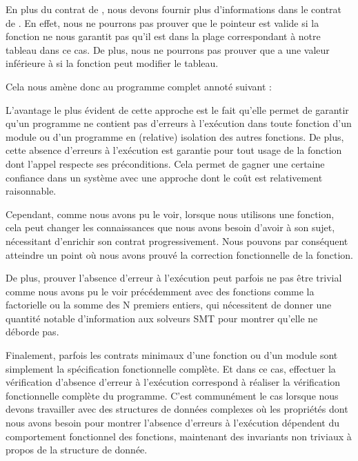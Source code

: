En plus du contrat de , nous devons fournir plus d'informations
dans le contrat de . En effet, nous ne pourrons pas prouver
que le pointeur est valide si la fonction ne nous garantit
pas qu'il est dans la plage correspondant à notre tableau dans ce cas. De plus,
nous ne pourrons pas prouver que  a une valeur inférieure à
 si la fonction peut modifier le tableau.


Cela nous amène donc au programme complet annoté suivant :






L'avantage le plus évident de cette approche est le fait qu'elle permet de garantir
qu'un programme ne contient pas d'erreurs à l'exécution dans toute fonction d'un
module ou d'un programme en (relative) isolation des autres fonctions. De plus,
cette absence d'erreurs à l'exécution est garantie pour tout usage de la fonction
dont l'appel respecte ses préconditions. Cela permet de gagner une certaine confiance
dans un système avec une approche dont le coût est relativement raisonnable.



Cependant, comme nous avons pu le voir, lorsque nous utilisons une fonction, cela
peut changer les connaissances que nous avons besoin d'avoir à son sujet, nécessitant
d'enrichir son contrat progressivement. Nous pouvons par conséquent atteindre un
point où nous avons prouvé la correction fonctionnelle de la fonction.



De plus, prouver l'absence d'erreur à l'exécution peut parfois ne pas être trivial
comme nous avons pu le voir précédemment avec des fonctions comme la factorielle ou
la somme des N premiers entiers, qui nécessitent de donner une quantité notable
d'information aux solveurs SMT pour montrer qu'elle ne déborde pas.



Finalement, parfois les contrats minimaux d'une fonction ou d'un module sont
simplement la spécification fonctionnelle complète. Et dans ce cas, effectuer la
vérification d'absence d'erreur à l'exécution correspond à réaliser la vérification
fonctionnelle complète du programme. C'est communément le cas lorsque nous devons
travailler avec des structures de données complexes où les propriétés dont nous
avons besoin pour montrer l'absence d'erreurs à l'exécution dépendent du
comportement fonctionnel des fonctions, maintenant des invariants non triviaux
à propos de la structure de donnée.


